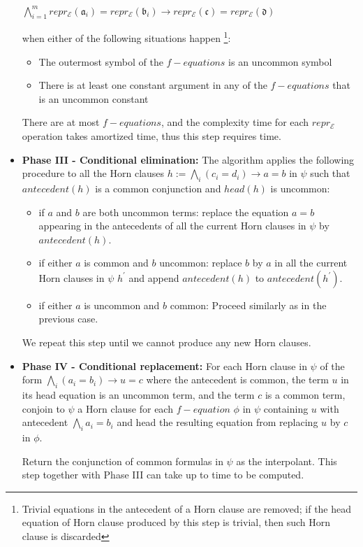 \begin{itemize}
    $\bigwedge_{i=1}^mrepr_{\mathcal{E}}(\mathfrak{a}_i)
    = repr_{\mathcal{E}}(\mathfrak{b}_i)
    \rightarrow
    repr_{\mathcal{E}}(\mathfrak{c}) 
    = repr_{\mathcal{E}}(\mathfrak{d})$

    when either of the following situations happen
    \footnote{Trivial equations in the antecedent
      of a Horn clause are removed; if the head equation 
      of Horn clause produced by this 
    step is trivial, then such Horn clause is discarded}:
    \begin{itemize}
      \item The outermost symbol of the $f-equations$ is an 
        uncommon symbol
      \item There is at least one constant argument in 
        any of the $f-equations$ 
        that is an uncommon constant
    \end{itemize}

    There are at most  $f-equations$, and the complexity
    time for each $repr_\mathcal{E}$ operation takes  
    amortized time, thus
    this step requires  time. 

  \item \textbf{Phase III - Conditional elimination:} 
    The algorithm applies the following procedure to
    all the Horn clauses 
    $h := \bigwedge_i (c_i = d_i) \rightarrow a = b$
    in $\psi$ such that 
    $antecedent(h)$ is a common conjunction and 
    $head(h)$ is uncommon:

    \begin{itemize}
      \item if $a$ and $b$ are both uncommon terms:
        replace the equation $a = b$ appearing in the antecedents
        of all the current Horn clauses in $\psi$ 
        by $antecedent(h)$.
      \item if either $a$ is common and $b$ uncommon: 
        replace $b$ by $a$
        in all the current Horn clauses in $\psi$
        $h^{'}$ and append $antecedent(h)$ to 
        $antecedent(h^{'})$.
      \item if either $a$ is uncommon and $b$ common: 
        Proceed similarly as in the
        previous case.
    \end{itemize}

    We repeat this step until we cannot produce any new 
    Horn clauses. 

  \item \textbf{Phase IV - Conditional replacement:} 
    For each Horn clause in $\psi$ of the form 
    $\bigwedge_i(a_i = b_i) 
    \rightarrow u = c$ 
    where the antecedent is common, the term $u$ in its 
    head equation is an uncommon term,
    and the term $c$ is a common term,
    conjoin to $\psi$ a Horn clause for each 
    $f-equation$ $\phi$
    in $\psi$ containing $u$
    with 
    antecedent $\bigwedge_i a_i = b_i$ and head the 
    resulting equation from replacing $u$ by $c$
    in $\phi$.

    Return the conjunction of common formulas in $\psi$
    as the interpolant. This step together with 
    Phase III can take up
    to  time to be computed.
\end{itemize}

